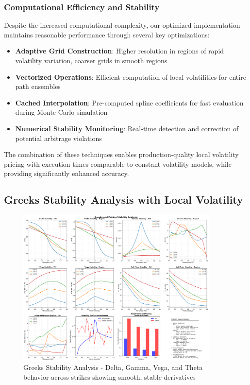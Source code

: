 \documentclass[11pt,a4paper]{article}
\begin{document}
\subsubsection{Computational Efficiency and Stability}

Despite the increased computational complexity, our optimized implementation maintains reasonable performance through several key optimizations:

\begin{itemize}
\item \textbf{Adaptive Grid Construction}: Higher resolution in regions of rapid volatility variation, coarser grids in smooth regions
\item \textbf{Vectorized Operations}: Efficient computation of local volatilities for entire path ensembles  
\item \textbf{Cached Interpolation}: Pre-computed spline coefficients for fast evaluation during Monte Carlo simulation
\item \textbf{Numerical Stability Monitoring}: Real-time detection and correction of potential arbitrage violations
\end{itemize}

The combination of these techniques enables production-quality local volatility pricing with execution times comparable to constant volatility models, while providing significantly enhanced accuracy.

\subsection{Greeks Stability Analysis with Local Volatility}

\begin{figure}[H]
\centering
\includegraphics[width=0.9\textwidth]{../charts/Local Vol Charts/stability_analysis_greeks.png}
\caption{Greeks Stability Analysis - Delta, Gamma, Vega, and Theta behavior across strikes showing smooth, stable derivatives}
\label{fig:greeks_stability}
\end{figure}
\end{document}
